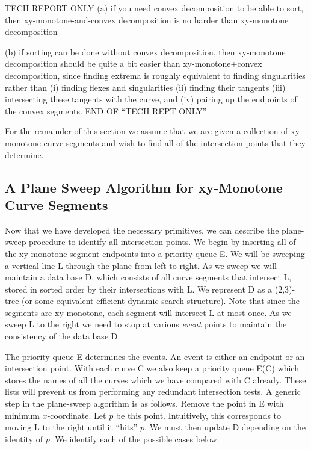 
\ifFull
TECH REPORT ONLY
(a) if you need convex decomposition to be able to sort, 
then xy-monotone-and-convex decomposition is no harder than xy-monotone
decomposition

(b) if sorting can be done without convex decomposition,
then xy-monotone decomposition should be quite a bit easier
than xy-monotone+convex decomposition, since
finding extrema is roughly equivalent to finding singularities rather 
than (i) finding flexes and singularities (ii) finding their tangents
(iii) intersecting these tangents with the curve, and
(iv) pairing up the endpoints of the convex segments.
END OF ``TECH REPT ONLY''
\fi

For the remainder of this section we assume that we are given a
collection of xy-monotone curve segments and wish to find all of the
intersection points that they determine.

\subsection{A Plane Sweep Algorithm for xy-Monotone Curve Segments}

Now that we have developed the necessary primitives, we can describe the
plane-sweep procedure to identify all intersection points.
We begin by inserting all of the xy-monotone segment endpoints into a priority
queue E.
We will be sweeping a vertical line L through the plane from left to right.
As we sweep we will maintain a data base D, which consists of all curve
segments that intersect L, stored in sorted order by their intersections with L.
We represent D as a (2,3)-tree \cite{ahu74} (or some equivalent efficient dynamic
search structure).
Note that since the segments are xy-monotone, each segment will intersect L at most
once.  As we sweep L to the right we need to stop at various {\em event} points to 
maintain the consistency of the data base D.

The priority queue E determines the events.
An event is either an endpoint or an intersection point.
With each curve C we also keep a priority queue E(C) which stores the names of 
all the curves which we have compared with C already.
These lists will prevent us from performing any redundant intersection tests.
A generic step in the plane-sweep algorithm is as follows.
Remove the point in E with minimum $x$-coordinate.
Let $p$ be this point.
Intuitively, this corresponds to moving L to the right until it ``hits'' $p$.
We must then update D depending on the identity of $p$.
We identify each of the possible cases below.

